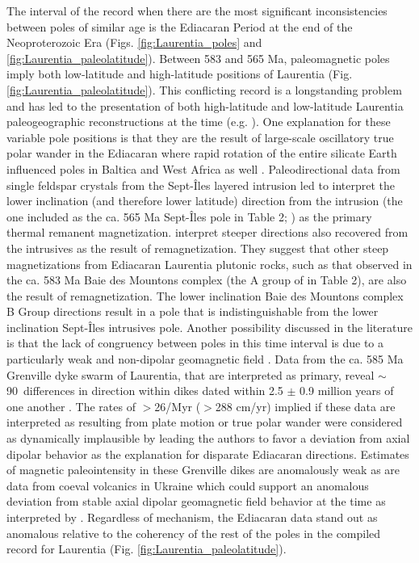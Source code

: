\documentclass[twocolumn, switch]{article} %
\begin{document}
The interval of the record when there are the most significant inconsistencies between poles of similar age is the Ediacaran Period at the end of the Neoproterozoic Era (Figs. \ref{fig:Laurentia_poles} and \ref{fig:Laurentia_paleolatitude}).  Between 583 and 565 Ma, paleomagnetic poles imply both low-latitude and high-latitude positions of Laurentia  (Fig. \ref{fig:Laurentia_paleolatitude}). This conflicting record is a longstanding problem and has led to the presentation of both high-latitude and low-latitude Laurentia paleogeographic reconstructions at the time (e.g. \citealp{Pisarevsky2001a,Li2008a}). One explanation for these variable pole positions is that they are the result of large-scale oscillatory true polar wander in the Ediacaran where rapid rotation of the entire silicate Earth influenced poles in Baltica and West Africa as well \citep{McCausland2007a, Robert2017a}. Paleodirectional data from single feldspar crystals from the Sept-\^Iles layered intrusion led \cite{Bono2015a} to interpret the lower inclination (and therefore lower latitude) direction from the intrusion (the one included as the ca. 565 Ma Sept-\^Iles pole in Table 2; \citealp{Tanczyk1987a}) as the primary thermal remanent magnetization.  \cite{Bono2015a} interpret steeper directions also recovered from the intrusives as the result of remagnetization. They suggest that other steep magnetizations from Ediacaran Laurentia plutonic rocks, such as that observed in the ca. 583 Ma Baie des Mountons complex (the A group of \cite{McCausland2011a} in Table 2), are also the result of remagnetization. The lower inclination Baie des Mountons complex B Group directions result in a pole that is indistinguishable from the lower inclination  Sept-\^Iles intrusives pole. Another possibility discussed in the literature is that the lack of congruency between poles in this time interval is due to a particularly weak and non-dipolar geomagnetic field \citep{Abrajevitch2010a, Halls2015a, Bono2019a}. Data from the ca. 585 Ma Grenville dyke swarm of Laurentia, that are interpreted as primary, reveal $\sim$90\textdegree\ differences in direction within dikes dated within 2.5 $\pm$ 0.9 million years of one another \citep{Halls2015a}. The rates of $>$26\textdegree /Myr ($>$288 cm/yr) implied if these data are interpreted as resulting from plate motion or true polar wander were considered as dynamically implausible by \cite{Halls2015a} leading the authors to favor a deviation from axial dipolar behavior as the explanation for disparate Ediacaran directions. Estimates of magnetic paleointensity in these Grenville dikes are anomalously weak \citep{Thallner2020a} as are data from coeval volcanics in Ukraine \citep{Shcherbakova2019a} which could support an anomalous deviation from stable axial dipolar geomagnetic field behavior at the time as interpreted by \cite{Halls2015a}.  Regardless of mechanism, the Ediacaran data stand out as anomalous relative to the coherency of the rest of the poles in the compiled record for Laurentia (Fig. \ref{fig:Laurentia_paleolatitude}). 
\end{document}

